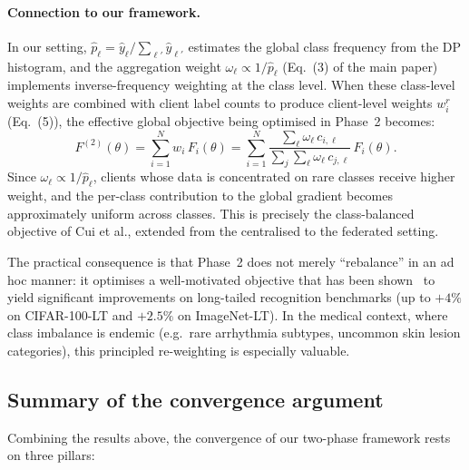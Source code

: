 \documentclass[runningheads]{llncs}
\begin{document}
\paragraph{Connection to our framework.}
In our setting, $\hat{p}_\ell = \hat{y}_\ell / \sum_{\ell'}\hat{y}_{\ell'}$ estimates the global class frequency from the DP histogram, and the aggregation weight $\omega_\ell\propto 1/\hat{p}_\ell$ (Eq.~(3) of the main paper) implements inverse-frequency weighting at the class level.
When these class-level weights are combined with client label counts to produce client-level weights $w_i^r$ (Eq.~(5)), the effective global objective being optimised in Phase~2 becomes:
\[
F^{(2)}(\theta) = \sum_{i=1}^{N} w_i \, F_i(\theta)
= \sum_{i=1}^{N} \frac{\sum_\ell \omega_\ell\,c_{i,\ell}}{\sum_j\sum_\ell \omega_\ell\,c_{j,\ell}} \, F_i(\theta).
\]
Since $\omega_\ell\propto 1/\hat{p}_\ell$, clients whose data is concentrated on rare classes receive higher weight, and the per-class contribution to the global gradient becomes approximately uniform across classes.
This is precisely the class-balanced objective of Cui et al., extended from the centralised to the federated setting.

The practical consequence is that Phase~2 does not merely ``rebalance'' in an ad hoc manner: it optimises a well-motivated objective that has been shown~\cite{ref_cui2019} to yield significant improvements on long-tailed recognition benchmarks (up to $+4\%$ on CIFAR-100-LT and $+2.5\%$ on ImageNet-LT).
In the medical context, where class imbalance is endemic (e.g.\ rare arrhythmia subtypes, uncommon skin lesion categories), this principled re-weighting is especially valuable.

\subsection{Summary of the convergence argument}

Combining the results above, the convergence of our two-phase framework rests on three pillars:
\end{document}
